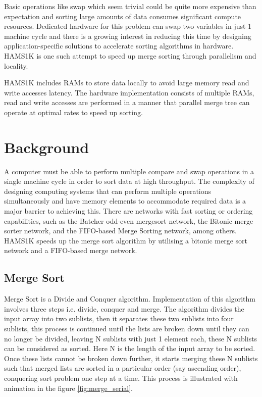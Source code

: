 \documentclass{article}
\begin{document}
Basic operations like swap which seem trivial could be quite more expensive than expectation and sorting large amounts of data consumes significant compute resources. Dedicated hardware for this problem can swap two variables in just 1 machine cycle and there is a growing interest in reducing this time by designing application-specific solutions to accelerate sorting algorithms in hardware. HAMS1K is one such attempt to speed up merge sorting through parallelism and locality.

HAMS1K includes RAMs to store data locally to avoid large memory read and write accesses latency. The hardware implementation consists of multiple RAMs, read and write accesses are performed in a manner that parallel merge tree can operate at optimal rates to speed up sorting.  


\section{Background}
A computer must be able to perform multiple compare and swap operations in a single machine cycle in order to sort data at high throughput. The complexity of designing computing systems that can perform multiple operations simultaneously and have memory elements to accommodate required data is a major barrier to achieving this. There are networks with fast sorting or ordering capabilities, such as the Batcher odd-even mergesort network, the Bitonic merge sorter network, and the FIFO-based Merge Sorting network, among others. HAMS1K speeds up the merge sort algorithm by utilising a bitonic merge sort network and a FIFO-based merge network.  

\subsection{Merge Sort}
Merge Sort is a Divide and Conquer algorithm. Implementation of this algorithm involves three steps i.e. divide, conquer and merge. The algorithm divides the input array into two sublists, then it separates these two sublists into four sublists, this process is continued until the lists are broken down until they can no longer be divided, leaving N sublists with just 1 element each, these N sublists can be considered as sorted. Here N is the length of the input array to be sorted.
Once these lists cannot be broken down further, it starts merging these N sublists such that merged lists are sorted in a particular order (say ascending order), conquering sort problem one step at a time. This process is illustrated with animation in the figure \ref{fig:merge_serial}.
\end{document}

